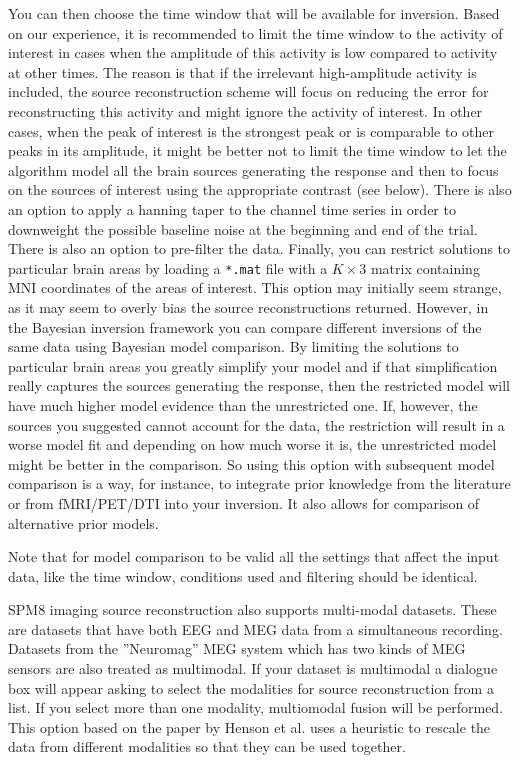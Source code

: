 You can then choose the time window that will be available for inversion. Based on our experience, it is recommended to limit the time window to the activity of interest in cases when the amplitude of this activity is low compared to activity at other times. The reason is that if the irrelevant high-amplitude activity is included, the source reconstruction scheme will focus on reducing the error for reconstructing this activity and might ignore the activity of interest. In other cases, when the peak of interest is the strongest peak or is comparable to other peaks in its amplitude, it might be better not to limit the time window to let the algorithm model all the brain sources generating the response and then to focus on the sources of interest using the appropriate contrast (see below). There is also an option to apply a hanning taper to the channel time series in order to downweight the possible baseline noise at the beginning and end of the trial. There is also an option to pre-filter the data. Finally, you can restrict solutions to particular brain areas by loading a \texttt{*.mat} file with a $K \times 3$ matrix containing MNI coordinates of the areas of interest. This option may initially seem strange, as it may seem to overly bias the source reconstructions returned. However, in the Bayesian inversion framework you can compare different inversions of the same data using Bayesian model comparison. By limiting the solutions to particular brain areas you greatly simplify your model and if that simplification really captures the sources generating the response, then the restricted model will have much higher model evidence than the unrestricted one. If, however, the sources you suggested cannot account for the data, the restriction will result in a worse model fit and depending on how much worse it is, the unrestricted model might be better in the comparison. So using this option with subsequent model comparison is a way, for instance, to integrate prior knowledge from the literature or from fMRI/PET/DTI into your inversion. It also allows for comparison of alternative prior models.

Note that for model comparison to be valid all the settings that affect the input data, like the time window, conditions used and filtering should be identical.

SPM8 imaging source reconstruction also supports multi-modal datasets. These are datasets that have both EEG and MEG data from a simultaneous recording. Datasets from the ''Neuromag'' MEG system which has two kinds of MEG sensors are also treated as multimodal. If your dataset is multimodal a dialogue box will appear asking to select the modalities for source reconstruction from a list. If you select more than one modality, multiomodal fusion will be performed. This option based on the paper by Henson et al. \cite{rnah_fusion} uses a heuristic to rescale the data from different modalities so that they can be used together. 

